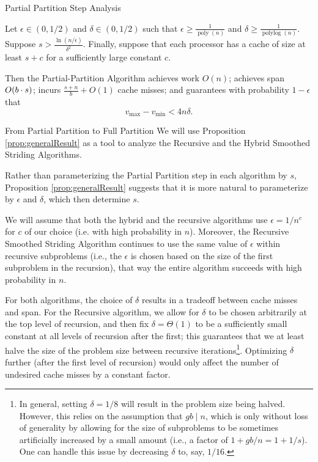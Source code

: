 \documentclass{beamer}
\DeclarePairedDelimiter{\paren}{(}{)}
\newcommand{\poly}{\operatorname{poly}}
\newcommand{\polylog}{\operatorname{polylog}}
\begin{document}
\begin{frame}[t]{Partial Partition Step Analysis}
\begin{proposition}
  \label{prop:generalResult}
  
  Let $\epsilon \in (0, 1/2)$ and $\delta \in (0, 1/2)$ such that
  $\epsilon \ge \frac{1}{\poly(n)}$ and $\delta \ge
  \frac{1}{\polylog(n)}$. Suppose $s > \frac{\ln
    (n/\epsilon)}{\delta^2}$. Finally, suppose that each processor has
  a cache of size at least $s + c$ for a sufficiently large constant
  $c$.

  Then the Partial-Partition Algorithm achieves work $O(n)$; achieves
  span $O\paren*{b \cdot s}$; incurs $\frac{s+n}{b} + O(1)$ cache
  misses; and guarantees with probability $1 - \epsilon$ that
  $$v_{\text{max}}-v_{\text{min}} < 4 n \delta.$$
\end{proposition}
\end{frame}

\begin{frame}[t]{From Partial Partition to Full Partition}
We will use Proposition \ref{prop:generalResult} as a tool to analyze the Recursive and the Hybrid Smoothed Striding Algorithms.

Rather than parameterizing the Partial Partition step in each algorithm by $s$, Proposition \ref{prop:generalResult} suggests that it is more natural to parameterize by $\epsilon$ and $\delta$, which then determine $s$.

We will assume that both the hybrid and the recursive algorithms use $\epsilon = 1/n^c$ for $c$ of our choice (i.e. with high probability in $n$). Moreover, the Recursive Smoothed Striding Algorithm continues to use the same value of $\epsilon$ within recursive subproblems (i.e., the $\epsilon$ is chosen based on the size of the first subproblem in the recursion), that way the entire algorithm succeeds with high probability in $n$.

For both algorithms, the choice of $\delta$ results in a tradeoff between cache misses and span. For the Recursive algorithm, we allow for $\delta$ to be chosen arbitrarily at the top level of recursion, and then fix $\delta  = \Theta(1)$ to be a sufficiently small constant at all levels of recursion after the first; this guarantees that we at least halve the size of the problem size between recursive iterations\footnote{In general, setting $\delta = 1/8$ will result in the problem size being halved. However, this relies on the assumption that $gb \mid n$, which is only without loss of generality by allowing for the size of subproblems to be sometimes artificially increased by a small amount (i.e., a factor of $1 + gb / n = 1 + 1/s$). One can handle this issue by decreasing $\delta$ to, say, $1/16$.}. Optimizing $\delta$ further (after the first level of recursion) would only affect the number of undesired cache misses by a constant factor.
\end{frame}
\end{document}
